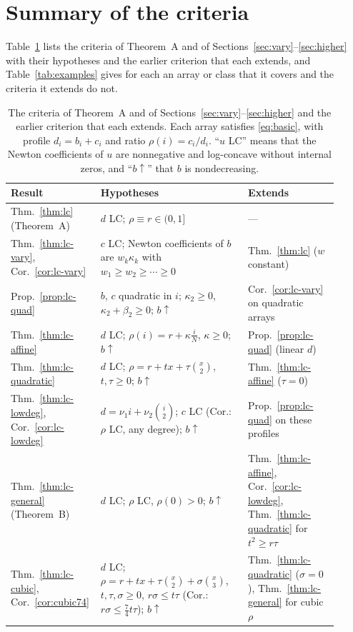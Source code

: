 \section{Summary of the criteria}\label{sec:summary}
Table~\ref{tab:map} lists the criteria of Theorem~A and of Sections~\ref{sec:vary}--\ref{sec:higher} with their hypotheses and the earlier criterion that each extends, and Table~\ref{tab:examples} gives for each an array or class that it covers and the criteria it extends do not.

\begin{table}[!ht]
\centering
\caption{The criteria of Theorem~A and of Sections~\ref{sec:vary}--\ref{sec:higher} and the earlier criterion that each extends. Each array satisfies \eqref{eq:basic}, with profile $d_i=b_i+c_i$ and ratio $\rho(i)=c_i/d_i$. ``$u$ LC'' means that the Newton coefficients of $u$ are nonnegative and log-concave without internal zeros, and ``$b\!\uparrow$'' that $b$ is nondecreasing.}\label{tab:map}
\renewcommand{\arraystretch}{1.15}
\begin{tabular}{@{}>{\raggedright\arraybackslash}p{0.2\linewidth}>{\raggedright\arraybackslash}p{0.44\linewidth}>{\raggedright\arraybackslash}p{0.27\linewidth}@{}}
Result & Hypotheses & Extends\\\hline
Thm.~\ref{thm:lc} (Theorem~A) & $d$ LC; $\rho\equiv r\in(0,1]$ & ---\\
Thm.~\ref{thm:lc-vary}, Cor.~\ref{cor:lc-vary} & $c$ LC; Newton coefficients of $b$ are $w_k\kappa_k$ with $w_1\geq w_2\geq\cdots\geq0$ & Thm.~\ref{thm:lc} ($w$ constant)\\
Prop.~\ref{prop:lc-quad} & $b$, $c$ quadratic in $i$; $\kappa_2\geq0$, $\kappa_2+\beta_2\geq0$; $b\!\uparrow$ & Cor.~\ref{cor:lc-vary} on quadratic arrays\\
Thm.~\ref{thm:lc-affine} & $d$ LC; $\rho(i)=r+\kappa\frac iN$, $\kappa\geq0$; $b\!\uparrow$ & Prop.~\ref{prop:lc-quad} (linear $d$)\\
Thm.~\ref{thm:lc-quadratic} & $d$ LC; $\rho=r+tx+\tau\binom x2$, $t,\tau\geq0$; $b\!\uparrow$ & Thm.~\ref{thm:lc-affine} ($\tau=0$)\\
Thm.~\ref{thm:lc-lowdeg}, Cor.~\ref{cor:lc-lowdeg} & $d=\nu_1i+\nu_2\binom i2$; $c$ LC (Cor.: $\rho$ LC, any degree); $b\!\uparrow$ & Prop.~\ref{prop:lc-quad} on these profiles\\
Thm.~\ref{thm:lc-general} (Theorem~B) & $d$ LC; $\rho$ LC, $\rho(0)>0$; $b\!\uparrow$ & Thm.~\ref{thm:lc-affine}, Cor.~\ref{cor:lc-lowdeg}, Thm.~\ref{thm:lc-quadratic} for $t^2\geq r\tau$\\
Thm.~\ref{thm:lc-cubic}, Cor.~\ref{cor:cubic74} & $d$ LC; $\rho=r+tx+\tau\binom x2+\sigma\binom x3$, $t,\tau,\sigma\geq0$, $r\sigma\leq t\tau$ (Cor.: $r\sigma\leq\frac74t\tau$); $b\!\uparrow$ & Thm.~\ref{thm:lc-quadratic} ($\sigma=0$), Thm.~\ref{thm:lc-general} for cubic $\rho$
\end{tabular}
\end{table}

